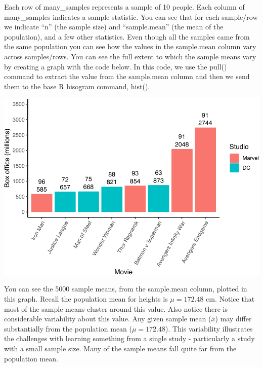 \documentclass[
]{krantz}
\makeatletter
\newenvironment{Shaded}{\begin{snugshade}}{\end{snugshade}}
\newcommand{\DataTypeTok}[1]{\textcolor[rgb]{0.27,0.27,0.27}{#1}}
\newcommand{\KeywordTok}[1]{\textcolor[rgb]{0.27,0.27,0.27}{\textbf{#1}}}
\newcommand{\NormalTok}[1]{#1}
\newcommand{\OperatorTok}[1]{\textcolor[rgb]{0.43,0.43,0.43}{\textbf{#1}}}
\newcommand{\StringTok}[1]{\textcolor[rgb]{0.5,0.5,0.5}{#1}}
\newenvironment{kframe}{%
\medskip{}
\setlength{\fboxsep}{.8em}
 \def\at@end@of@kframe{}%
 \ifinner\ifhmode%
  \def\at@end@of@kframe{\end{minipage}}%
  \begin{minipage}{\columnwidth}%
 \fi\fi%
 \def\FrameCommand##1{\hskip\@totalleftmargin \hskip-\fboxsep
 \colorbox{shadecolor}{##1}\hskip-\fboxsep
     \hskip-\linewidth \hskip-\@totalleftmargin \hskip\columnwidth}%
 \MakeFramed {\advance\hsize-\width
   \@totalleftmargin\z@ \linewidth\hsize
   \@setminipage}}%
 {\par\unskip\endMakeFramed%
 \at@end@of@kframe}
\renewenvironment{Shaded}{\begin{kframe}}{\end{kframe}}
\makeatother
\begin{document}
Each row of many\_samples represents a sample of 10 people. Each column of many\_samples indicates a sample statistic. You can see that for each sample/row we indicate ``n'' (the sample size) and ``sample.mean'' (the mean of the population), and a few other statistics. Even though all the samples came from the same population you can see how the values in the sample.mean column vary across samples/rows. You can see the full extent to which the sample means vary by creating a graph with the code below. In this code, we use the pull() command to extract the value from the sample.mean column and then we send them to the base R hisogram command, hist().

\begin{Shaded}
\end{Shaded}

\includegraphics{bookdown_files/figure-latex/unnamed-chunk-217-1.pdf}

You can see the 5000 sample means, from the sample.mean column, plotted in this graph. Recall the population mean for heights is \(\mu = 172.48\) cm. Notice that most of the sample means cluster around this value. Also notice there is considerable variability about this value. Any given sample mean (\(\bar{x}\)) may differ substantially from the population mean (\(\mu = 172.48\)). This variability illustrates the challenges with learning something from a single study - particularly a study with a small sample size. Many of the sample means fall quite far from the population mean.
\end{document}
